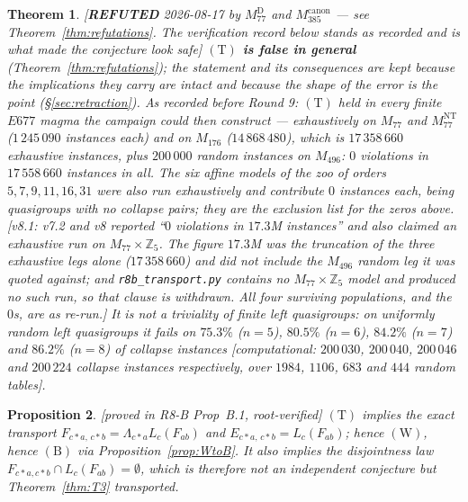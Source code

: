 \documentclass[11pt]{article}
\theoremstyle{plain}
\newtheorem{theorem}{Theorem}[section]
\newtheorem{proposition}[theorem]{Proposition}
\theoremstyle{definition}
\theoremstyle{remark}
\numberwithin{equation}{section}
\newcommand{\Z}{\mathbb{Z}}
\newcommand{\op}{\mathbin{*}}
\newcommand{\statusbox}[1]{{\small\sloppy\textsf{[#1]}}}
\newcommand{\PROVED}[1]{\statusbox{proved in #1, root-verified}}
\newcommand{\COMP}[1]{\statusbox{computational: #1}}
\begin{document}
\begin{theorem}\label{thm:Tstatus}
\statusbox{\textbf{REFUTED} 2026-08-17 by $M_{77}^{\mathrm{D}}$ and
$M_{385}^{\mathrm{canon}}$ --- see Theorem~\ref{thm:refutations}. The verification
record below stands as recorded and is what made the conjecture look safe}
\textbf{$(\mathrm{T})$ is false in general} (Theorem~\ref{thm:refutations}); the
statement and its consequences are kept because the implications they carry are
intact and because the shape of the error is the point (\S\ref{sec:retraction}).
As recorded before Round 9:
$(\mathrm{T})$ held in every finite $E677$ magma the campaign could then
construct --- exhaustively on $M_{77}$ and $M_{77}^{\mathrm{NT}}$
($1\,245\,090$ instances each) and on $M_{176}$ ($14\,868\,480$), which is
$17\,358\,660$ exhaustive instances, plus $200\,000$ random instances on
$M_{496}$: $0$ violations in $17\,558\,660$ instances in all. The six affine
models of the zoo of orders $5,7,9,11,16,31$ were also run exhaustively and
contribute $0$ instances each, being quasigroups with no collapse pairs; they are
the exclusion list for the zeros above.
[v8.1: v7.2 and v8 reported ``$0$ violations in $17.3$M instances'' and also
claimed an exhaustive run on $M_{77}\times\Z_5$. The figure $17.3$M was the
truncation of the three \emph{exhaustive} legs alone ($17\,358\,660$) and did not
include the $M_{496}$ random leg it was quoted against; and
\texttt{r8b\_transport.py} contains no $M_{77}\times\Z_5$ model and produced no
such run, so that clause is withdrawn. All four surviving populations, and the
$0$s, are as re-run.]
It
is \emph{not} a triviality of finite left quasigroups: on uniformly random left
quasigroups it fails on $75.3\%$ ($n=5$), $80.5\%$ ($n=6$), $84.2\%$ ($n=7$) and
$86.2\%$ ($n=8$) of collapse instances \COMP{$200\,030$, $200\,040$, $200\,046$
and $200\,224$ collapse instances respectively, over $1984$, $1106$, $683$ and
$444$ random tables}.
\end{theorem}

\begin{proposition}\label{prop:TimpliesW}
\PROVED{R8-B Prop~B.1}\;\statusbox{implication intact; \emph{hypothesis
$(\mathrm{T})$ refuted}, \S\ref{sec:retraction}}
$(\mathrm{T})$ implies the \emph{exact} transport
$F_{c\op a,\,c\op b} = \Lambda_{c\op a}L_c(F_{ab})$ and
$E_{c\op a,\,c\op b} = L_c(F_{ab})$; hence $(\mathrm{W})$, hence $(\mathrm{B})$
via Proposition~\ref{prop:WtoB}. It also implies the disjointness law
$F_{c\op a,c\op b}\cap L_c(F_{ab}) = \emptyset$, which is therefore not an
independent conjecture but Theorem~\ref{thm:T3} transported.
\end{proposition}
\end{document}
